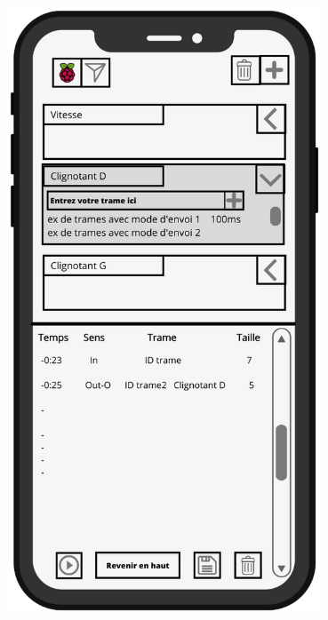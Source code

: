 \vspace{0.5cm}
\begin{minipage}{0.5\linewidth}
    \centering
    \includegraphics[width=0.7\textwidth]{sections/3_Exigences_specifiques/1_IHM/ihm/ecranPrincipalSelectionObjet.png}
    \captionsetup{justification=centering}
     \label{ecran_objet_selectionne}
\end{minipage}\hfill

